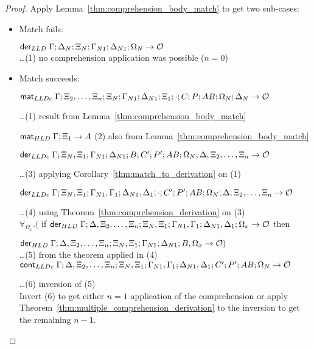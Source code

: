 \begin{proof}
Apply Lemma~\ref{thm:comprehension_body_match} to get two sub-cases:
   
\begin{itemize}[leftmargin=*]
   \item Match fails:
   
   
   $\mathsf{der}_{LLD} \; \Gamma; \Delta_N; \Xi_N; \Gamma_{N1}; \Delta_{N1}; \Omega_N
   \rightarrow \mathcal{O}$\\
   \dots \hfill (1) no comprehension application was possible ($n = 0$)\\
   
   \item Match succeeds:
   
   $\mathsf{mat}_{LLDc} \; \Gamma; \Xi_2, \dotsc, \Xi_n; \Xi_N; \Gamma_{N1}; \Delta_{N1}; \Xi_1; \cdot; C; P; AB; \Omega_N; \Delta_N \rightarrow \mathcal{O}$
   
   \dots \hfill (1) result from Lemma~\ref{thm:comprehension_body_match}
   
   $\mathsf{mat}_{HLD} \; \Gamma; \Xi_1 \rightarrow A$
   \hfill (2) also from Lemma~\ref{thm:comprehension_body_match}
   
   $\mathsf{der}_{LLDc} \; \Gamma; \Xi_N, \Xi_1; \Gamma_{N1}; \Delta_{N1}; B; C'; P'; AB;
   \Omega_N; \Delta, \Xi_2, \dotsc, \Xi_n \rightarrow \mathcal{O}$
   
   \dots \hfill (3) applying Corollary~\ref{thm:match_to_derivation} on (1)
   
   $\mathsf{der}_{LLDc} \; \Gamma; \Xi_N, \Xi_1; \Gamma_{N1}, \Gamma_1; \Delta_{N1}, \Delta_1;
   \cdot; C'; P'; AB; \Omega_N; \Delta, \Xi_2, \dotsc, \Xi_n \rightarrow \mathcal{O}$
   
   \dots \hfill (4) using Theorem~\ref{thm:comprehension_derivation} on (3)\\
   
   $\forall_{\Omega_x}. ($ if $\mathsf{der}_{HLD} \; \Gamma; \Delta, \Xi_2, \dotsc, \Xi_n; \Xi_N, \Xi_1; \Gamma_{N1}, \Gamma_1; \Delta_{N1}, \Delta_1; \Omega_x \rightarrow \mathcal{O}$ then
   
    \hspace*{0.5cm} $\mathsf{der}_{HLD} \; \Gamma; \Delta, \Xi_2, \dotsc, \Xi_n; \Xi_N, \Xi_1; \Gamma_{N1};
    \Delta_{N1}; B, \Omega_x \rightarrow \mathcal{O})$ \\ \dots \hfill (5)
   from the theorem applied in (4)\\
   
   $\mathsf{cont}_{LLDc} \; \Gamma; \Delta, \Xi_2, \dotsc, \Xi_n; \Xi_N, \Xi_1; \Gamma_{N1},
   \Gamma_1; \Delta_{N1}, \Delta_1; C'; P'; AB; \Omega_N \rightarrow \mathcal{O}$
   
   \dots \hfill (6) inversion of (5)\\
   
   Invert (6) to get either $n = 1$ application of the comprehension or apply Theorem~\ref{thm:multiple_comprehension_derivation} to the inversion to get the remaining $n-1$. 
\end{itemize}
\end{proof}

